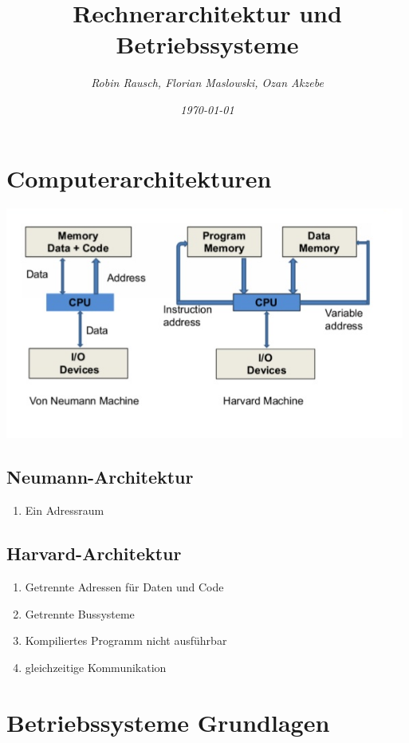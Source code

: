 \documentclass[12pt,a4paper]{article}
\author{\slshape Robin Rausch, Florian Maslowski, Ozan Akzebe}
\title{Rechnerarchitektur und Betriebssysteme}
\date{\slshape \today}
\begin{document}
\maketitle
\tableofcontents
\newpage
\section{Computerarchitekturen}
	\includegraphics[width=\textwidth]{Bilder/Von-Neuman-Vs-Harvard-Architecture.png}

	\begin{minipage}[t]{0.4\textwidth}
		\subsection{Neumann-Architektur}
		\begin{enumerate}
			\item Ein Adressraum
		\end{enumerate}
	\end{minipage}
	\begin{minipage}[t]{0.55\textwidth}
		\subsection{Harvard-Architektur}
		\begin{enumerate}
			\item Getrennte Adressen für Daten und Code
			\item Getrennte Bussysteme
			\item Kompiliertes Programm nicht ausführbar
			\item gleichzeitige Kommunikation 
		\end{enumerate}
	\end{minipage}

\section{Betriebssysteme Grundlagen}
\end{document}
